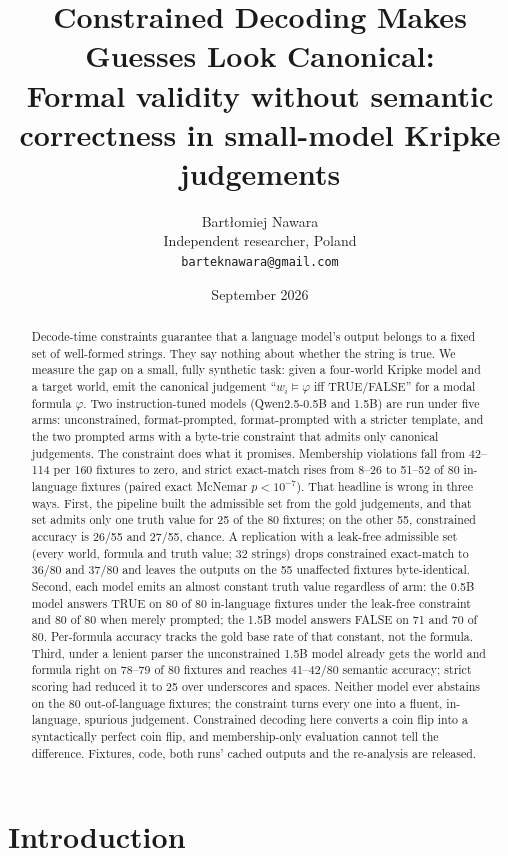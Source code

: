 \documentclass[11pt]{article}
\title{Constrained Decoding Makes Guesses Look Canonical:\\
\large Formal validity without semantic correctness in small-model Kripke judgements}
\author{Bart{\l}omiej Nawara\\
Independent researcher, Poland\\
\texttt{barteknawara@gmail.com}}
\date{September 2026}
\begin{document}
\maketitle

\begin{abstract}
Decode-time constraints guarantee that a language model's output belongs to a fixed set of well-formed strings. They say nothing about whether the string is true. We measure the gap on a small, fully synthetic task: given a four-world Kripke model and a target world, emit the canonical judgement ``$w_i \models \varphi$ iff TRUE/FALSE'' for a modal formula $\varphi$. Two instruction-tuned models (Qwen2.5-0.5B and 1.5B) are run under five arms: unconstrained, format-prompted, format-prompted with a stricter template, and the two prompted arms with a byte-trie constraint that admits only canonical judgements. The constraint does what it promises. Membership violations fall from 42--114 per 160 fixtures to zero, and strict exact-match rises from 8--26 to 51--52 of 80 in-language fixtures (paired exact McNemar $p<10^{-7}$). That headline is wrong in three ways. First, the pipeline built the admissible set from the gold judgements, and that set admits only one truth value for 25 of the 80 fixtures; on the other 55, constrained accuracy is 26/55 and 27/55, chance. A replication with a leak-free admissible set (every world, formula and truth value; 32 strings) drops constrained exact-match to 36/80 and 37/80 and leaves the outputs on the 55 unaffected fixtures byte-identical. Second, each model emits an almost constant truth value regardless of arm: the 0.5B model answers TRUE on 80 of 80 in-language fixtures under the leak-free constraint and 80 of 80 when merely prompted; the 1.5B model answers FALSE on 71 and 70 of 80. Per-formula accuracy tracks the gold base rate of that constant, not the formula. Third, under a lenient parser the unconstrained 1.5B model already gets the world and formula right on 78--79 of 80 fixtures and reaches 41--42/80 semantic accuracy; strict scoring had reduced it to 25 over underscores and spaces. Neither model ever abstains on the 80 out-of-language fixtures; the constraint turns every one into a fluent, in-language, spurious judgement. Constrained decoding here converts a coin flip into a syntactically perfect coin flip, and membership-only evaluation cannot tell the difference. Fixtures, code, both runs' cached outputs and the re-analysis are released.
\end{abstract}

\section{Introduction}
\end{document}
